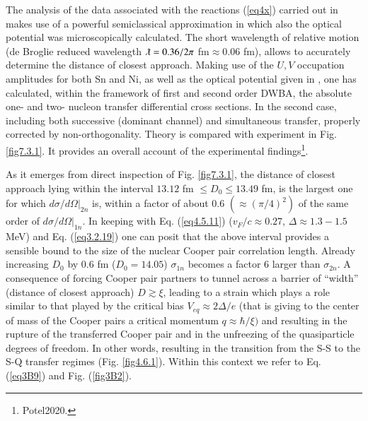 The analysis of the data associated with the reactions (\ref{eq4x})  carried out in \cite{Montanari:14,Montanari:16} makes use of a powerful semiclassical approximation in which also the optical potential was microscopically calculated. The short wavelength of relative motion (de Broglie reduced wavelength $\lambdabar=0.36/2\pi$ fm$\approx0.06$ fm), allows to accurately determine the distance of closest approach. Making use of the $U,V$ occupation amplitudes for both Sn and Ni, as well as the optical potential given in \cite{Montanari:14}, one has calculated, within the framework of first and second order DWBA, the absolute one- and two- nucleon transfer differential cross sections.  In the second case, including both successive (dominant channel) and simultaneous transfer, properly corrected by non-orthogonality. Theory is compared with experiment in Fig. \ref{fig7.3.1}. It provides an overall account of the experimental findings\footnote{\cite{Potel:20b}\cite{Potel:20b} Potel2020.}.

As it emerges from direct inspection of Fig. \ref{fig7.3.1}, the distance of closest approach lying within the interval $13.12$ fm $\leq D_0\leq13.49$ fm, is the largest one for which $d\sigma /d\Omega|_{2n}$ is, within a factor of about 0.6 $(\approx(\pi/4)^2)$ of the same order of $d\sigma /d\Omega|_{1n}$. In keeping with Eq. (\ref{eq4.5.11}) ($v_F/c\approx0.27$, $\Delta\approx1.3-1.5$ MeV) and Eq. (\ref{eq3.2.19}) one can posit that the above interval provides a sensible bound to the size of the nuclear Cooper pair correlation length.  Already increasing $D_0$ by 0.6 fm ($D_0=14.05$) $\sigma_{1n}$ becomes a factor 6 larger than $\sigma_{2n}$. A consequence  of forcing Cooper pair partners to tunnel across a barrier of ``width'' (distance of closest approach) $D\gtrsim\xi$, leading to a strain which plays a role similar to that played by the critical bias $V_{eq}\approx2\Delta/e$ (that is giving to the center of mass of the Cooper pairs a critical momentum $q\approx\hbar/\xi)$ and resulting in the rupture of the transferred Cooper pair and in the unfreezing of the quasiparticle degrees of freedom. In other words, resulting in the transition from the S-S to the S-Q transfer  regimes (Fig. \ref{fig4.6.1}). Within this context we refer to Eq. (\ref{eq3B9}) and Fig. (\ref{fig3B2}).
 
